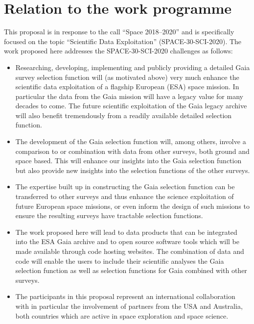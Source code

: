\section{Relation to the work programme}
\label{sec:relation-to-work-programme}

This proposal is in response to the call ``Space 2018--2020'' and is specifically focused on the topic ``Scientific Data Exploitation'' (SPACE-30-SCI-2020). The work proposed here addresses the SPACE-30-SCI-2020 challenges as follows:
\begin{itemize}
    \item Researching, developing, implementing and publicly providing a detailed Gaia survey selection function will (as motivated above) very much enhance the scientific data exploitation of a flagship European (ESA) space mission. In particular the data from the Gaia mission will have a legacy value for many decades to come. The future scientific exploitation of the Gaia legacy archive will also benefit tremendously from a readily available detailed selection function.
    \item The development of the Gaia selection function will, among others, involve a comparison to or combination with data from other surveys, both ground and space based.  This will enhance our insights into the Gaia selection function but also provide new insights into the selection functions of the other surveys. 
    \item The expertise built up in constructing the Gaia selection function can be transferred to other surveys and thus enhance the science exploitation of future European space missions, or even inform the design of such missions to ensure the resulting surveys have tractable selection functions.
    \item The work proposed here will lead to data products that can be integrated into the ESA Gaia archive and to open source software tools which will be made available through code hosting websites. The combination of data and code will enable the users to include their scientific analyses the Gaia selection function as well as selection functions for Gaia combined with other surveys.
    \item The participants in this proposal represent an international collaboration with in particular the involvement of partners from the USA and Australia, both countries which are active in space exploration and space science.
\end{itemize}

